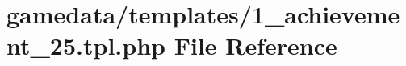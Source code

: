 \hypertarget{1__achievement__25_8tpl_8php}{\section{gamedata/templates/1\+\_\+achievement\+\_\+25.tpl.\+php File Reference}
\label{1__achievement__25_8tpl_8php}
}

